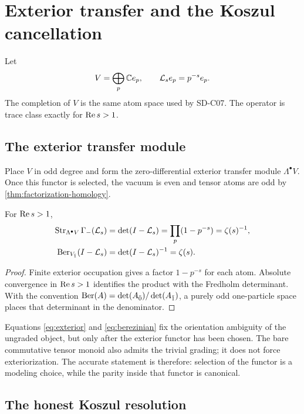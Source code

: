 \section{Exterior transfer and the Koszul cancellation}

Let
\[
 V=\bigoplus_{p}\mathbb C e_p,
 \qquad
 \mathcal L_s e_p=p^{-s}e_p.
\]
The completion of $V$ is the same atom space used by SD-C07. The operator is
trace class exactly for $\operatorname{Re} s>1$.

\subsection{The exterior transfer module}

Place $V$ in odd degree and form the zero-differential exterior transfer
module $\Lambda^\bullet V$. Once this functor is selected, the vacuum is even
and tensor atoms are odd by \cref{thm:factorization-homology}.

\begin{theorem}
\label{thm:exterior}
For $\operatorname{Re} s>1$,
\begin{align}
 \operatorname{Str}_{\Lambda^\bullet V}\Gamma_-(\mathcal L_s)
 &=\det(I-\mathcal L_s)
 =\prod_p(1-p^{-s})
 =\zeta(s)^{-1}, \label{eq:exterior}\\
 \operatorname{Ber}_{V_{\bar1}}(I-\mathcal L_s)
 &=\det(I-\mathcal L_s)^{-1}
 =\zeta(s). \label{eq:berezinian}
\end{align}
\end{theorem}

\begin{proof}
Finite exterior occupation gives a factor $1-p^{-s}$ for each atom.
Absolute convergence in $\operatorname{Re} s>1$ identifies the product with the
Fredholm determinant. With the convention
$\operatorname{Ber}(A)=\det(A_{\bar0})/\det(A_{\bar1})$, a purely odd one-particle space
places that determinant in the denominator.
\end{proof}

Equations \eqref{eq:exterior} and \eqref{eq:berezinian} fix the orientation
ambiguity of the ungraded object, but only after the exterior functor has been
chosen. The bare commutative tensor monoid also admits the trivial grading;
it does not force exteriorization. The accurate statement is therefore:
selection of the functor is a modeling choice, while the parity inside that
functor is canonical.

\subsection{The honest Koszul resolution}

